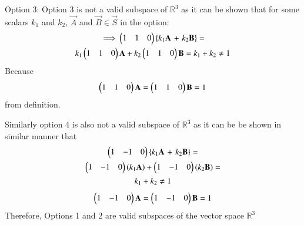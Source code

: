 {Option 3:}
Option 3 is not a valid subspace of $\mathbb{R}^3$ as it can be shown that for some scalars $k_1$ and $k_2$, $\vec{A}$ and $\vec{B} \in \vec{S}$ in the option:
\begin{multline}
    \implies \begin{pmatrix}1 & 1 & 0\end{pmatrix}\left\{k_1\mathbf{A}\right. + \left.k_2\mathbf{B}\right\} = \\
    k_1\begin{pmatrix}1 & 1 & 0\end{pmatrix}\mathbf{A} + k_2\begin{pmatrix}1 & 1 & 0\end{pmatrix}\mathbf{B} = k_1 + k_2 \neq 1
\end{multline}
Because
\begin{align}
  \begin{pmatrix}1 & 1 & 0\end{pmatrix}\mathbf{A} = \begin{pmatrix}1 & 1 & 0\end{pmatrix}\mathbf{B} = 1
\end{align} from definition.

Similarly option 4 is also not a valid subspace of $\mathbb{R}^3$ as it can be be shown in similar manner that
\begin{multline}
    \begin{pmatrix}1 & -1 & 0\end{pmatrix}\left\{k_1\mathbf{A}\right. + \left.k_2\mathbf{B}\right\} = \\
    \begin{pmatrix}1 & -1 & 0\end{pmatrix}(k_1\mathbf{A}) + \begin{pmatrix}1 & -1 & 0\end{pmatrix}(k_2\mathbf{B}) = \\
    k_1 + k_2 \neq 1
\end{multline}
\begin{align}
  \begin{pmatrix}1 & -1 & 0\end{pmatrix}\mathbf{A} = \begin{pmatrix}1 & -1 & 0\end{pmatrix}\mathbf{B} = 1
\end{align}
Therefore, Options 1 and 2 are valid subspaces of the vector space $\mathbb{R}^3$
